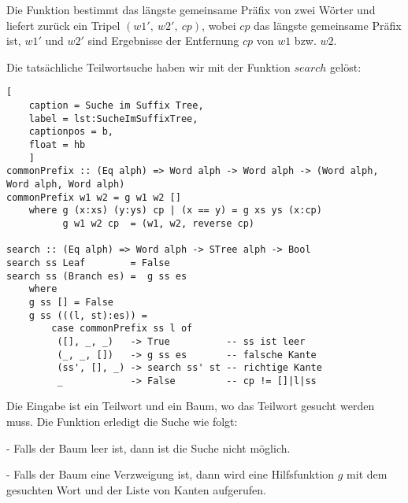 \documentclass[12pt]{report}
\begin{document}
Die Funktion bestimmt das längste gemeinsame Präfix von zwei Wörter und liefert zurück ein Tripel $(w1',\: w2',\: cp)$, wobei $cp$ das längste gemeinsame Präfix ist, $w1'$ und $w2'$ sind Ergebnisse der Entfernung $cp$ von $w1$ bzw. $w2$.

Die tatsächliche Teilwortsuche haben wir mit der Funktion $search$ gelöst:

\begin{lstlisting}[
    caption = Suche im Suffix Tree,
    label = lst:SucheImSuffixTree,
    captionpos = b,
    float = hb
    ]
commonPrefix :: (Eq alph) => Word alph -> Word alph -> (Word alph, Word alph, Word alph)
commonPrefix w1 w2 = g w1 w2 []
    where g (x:xs) (y:ys) cp | (x == y) = g xs ys (x:cp)
          g w1 w2 cp  = (w1, w2, reverse cp)

search :: (Eq alph) => Word alph -> STree alph -> Bool
search ss Leaf        = False
search ss (Branch es) =  g ss es
    where
    g ss [] = False
    g ss (((l, st):es)) =
        case commonPrefix ss l of
         ([], _, _)   -> True          -- ss ist leer
         (_, _, [])   -> g ss es       -- falsche Kante
         (ss', [], _) -> search ss' st -- richtige Kante
         _            -> False         -- cp != []|l|ss
\end{lstlisting}

Die Eingabe ist ein Teilwort und ein Baum, wo das Teilwort gesucht werden muss. Die Funktion erledigt die Suche wie folgt:

    - Falls der Baum leer ist, dann ist die Suche nicht möglich.

    - Falls der Baum eine Verzweigung ist, dann wird eine Hilfsfunktion $g$ mit dem gesuchten Wort und der Liste von Kanten aufgerufen.
\end{document}
